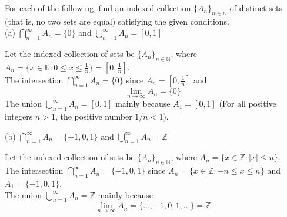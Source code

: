 \documentclass[12pt]{article}
\newcommand{\N}{\mathbb{N}}
\newcommand{\Z}{\mathbb{Z}}
\newcommand{\R}{\mathbb{R}}
\newenvironment{problem}[2][Problem]{\begin{trivlist}
		\item[\hskip \labelsep {\bfseries #1}\hskip \labelsep {\bfseries #2.}]}{\end{trivlist}}
\newenvironment{solution}[2][Solution]{\begin{trivlist}
		\item[\hskip \labelsep {\bfseries #1}\hskip \labelsep {\bfseries #2.}]}{\end{trivlist}}
\begin{document}
	\begin{problem}{41}
		For each of the following, find an indexed collection $\{A_{n}\}_{n\in \N}$ of distinct sets (that is, no two sets are equal) satisfying the given conditions.\\
		
		(a) $\bigcap\limits_{n=1}^{\infty} A_{n} = \{0\}$ and $\bigcup\limits_{n=1}^{\infty}A_{n}=[0,1]$
		\begin{solution}{a}
			 Let the indexed collection of sets be $\{A_{n}\}_{n\in \N}$, where $A_{n} = \{x\in \R: 0\leq x \leq \frac{1}{n}\} = \left[0,\frac{1}{n}\right]$.\\
			 The intersection $\bigcap_{n=1}^{\infty} A_{n} = \{0\}$ since $A_{n} = \left[0,\frac{1}{n}\right]$ 
			 and
			 \begin{equation*}
			 	\lim_{n\to \infty} A_{n} = \{0\}
			 \end{equation*} 
			 The union $\bigcup_{n=1}^{\infty}A_{n}=[0,1]$ mainly because $A_{1} = [0,1]$ (For all positive integers $n>1$, the positive number $1/n < 1$).
		\end{solution}
	
		(b) $\bigcap\limits_{n=1}^{\infty} A_{n} = \{-1,0,1\}$ and $\bigcup\limits_{n=1}^{\infty}A_{n}= \Z$
		\begin{solution}{b}
			 Let the indexed collection of sets be $\{A_{n}\}_{n\in \N}$, where $A_{n} = \{x\in \Z: |x| \leq n\}$.\\
			 The intersection $\bigcap_{n=1}^{\infty} A_{n} = \{-1,0,1\}$ since $A_{n} = \{x\in \Z: -n\leq x\leq n\}$ and $A_{1} = \{-1,0,1\}$.\\
			 The union $\bigcup_{n=1}^{\infty}A_{n}= \Z$ mainly because 
			 \begin{equation*}
			 	\lim_{n\to \infty} A_{n} = \{\ldots,-1,0,1,\ldots\} = \Z
			 \end{equation*}
		\end{solution}
	\end{problem}
\end{document}
